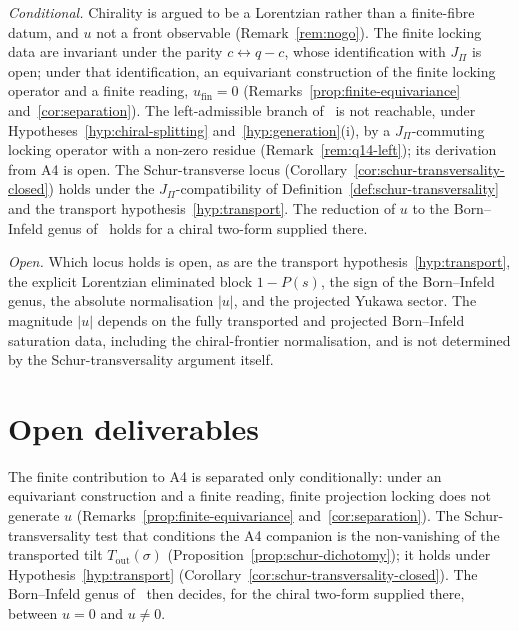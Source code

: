 \documentclass[11pt]{article}
\theoremstyle{definition}
\begin{document}
    \noindent\emph{Conditional.}
    Chirality is argued to be a Lorentzian rather than a finite-fibre datum, and $u$ not a front observable
    (Remark~\ref{rem:nogo}).
    The finite locking data are invariant under the parity $c\leftrightarrow q-c$, whose identification with $J_\Pi$ is
    open; under that identification, an equivariant construction of the finite locking operator and a finite reading,
    $u_{\mathrm{fin}}=0$ (Remarks~\ref{prop:finite-equivariance} and~\ref{cor:separation}).
    The left-admissible branch of~\cite{Beau2026q14} is not reachable, under Hypotheses~\ref{hyp:chiral-splitting}
    and~\ref{hyp:generation}(i), by a $J_\Pi$-commuting locking operator with a non-zero residue (Remark~\ref{rem:q14-left}); its derivation from A4 is open.
    The Schur-transverse locus (Corollary~\ref{cor:schur-transversality-closed}) holds under the
    $J_\Pi$-compatibility of Definition~\ref{def:schur-transversality} and the transport
    hypothesis~\ref{hyp:transport}.
    The reduction of $u$ to the Born--Infeld genus of~\cite{Beau2026bim} holds for a chiral two-form supplied there.

    \noindent\emph{Open.}
    Which locus holds is open, as are the transport hypothesis~\ref{hyp:transport}, the explicit
    Lorentzian eliminated block $1-P(s)$, the sign of the Born--Infeld genus, the absolute normalisation $|u|$, and the
    projected Yukawa sector.
    The magnitude $|u|$ depends on the fully transported and projected Born--Infeld saturation data,
    including the chiral-frontier normalisation, and is not determined by the Schur-transversality argument
    itself.

  \section{Open deliverables}
    \label{sec:open}

    The finite contribution to A4 is separated only conditionally: under an equivariant construction and a finite
    reading, finite projection locking does not generate $u$
    (Remarks~\ref{prop:finite-equivariance} and~\ref{cor:separation}).
    The Schur-transversality test that conditions the A4 companion is the non-vanishing of the transported tilt
    $T_{\mathrm{out}}(\sigma)$ (Proposition~\ref{prop:schur-dichotomy}); it holds under
    Hypothesis~\ref{hyp:transport} (Corollary~\ref{cor:schur-transversality-closed}).
    The Born--Infeld genus of~\cite{Beau2026bim} then decides, for the chiral two-form supplied there, between
    $u=0$ and $u\neq0$.
\end{document}
